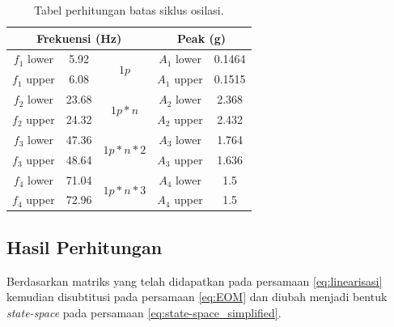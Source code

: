 \begin{table}[]
	\caption{Tabel perhitungan batas siklus osilasi.}
	\label{tb:batas_siklus}
	\centering
	\begin{tabular}{|ccc|cc|}
		\hline
		\multicolumn{3}{|c|}{Frekuensi (Hz)}                                                       & \multicolumn{2}{c|}{Peak (g)}             \\ \hline
		\multicolumn{1}{|c|}{$f_1$ lower} & \multicolumn{1}{c|}{5.92}  & \multirow{2}{*}{$1p$}       & \multicolumn{1}{c|}{$A_1$ lower} & 0.1464 \\ \cline{1-2} \cline{4-5} 
		\multicolumn{1}{|c|}{$f_1$ upper} & \multicolumn{1}{c|}{6.08}  &                           & \multicolumn{1}{c|}{$A_1$ upper} & 0.1515 \\ \hline
		\multicolumn{1}{|c|}{$f_2$ lower} & \multicolumn{1}{c|}{23.68} & \multirow{2}{*}{$1p*n$}   & \multicolumn{1}{c|}{$A_2$ lower} & 2.368  \\ \cline{1-2} \cline{4-5} 
		\multicolumn{1}{|c|}{$f_2$ upper} & \multicolumn{1}{c|}{24.32} &                           & \multicolumn{1}{c|}{$A_2$ upper} & 2.432  \\ \hline
		\multicolumn{1}{|c|}{$f_3$ lower} & \multicolumn{1}{c|}{47.36} & \multirow{2}{*}{$1p*n*2$} & \multicolumn{1}{c|}{$A_3$ lower} & 1.764 \\ \cline{1-2} \cline{4-5} 
		\multicolumn{1}{|c|}{$f_3$ upper} & \multicolumn{1}{c|}{48.64} &                           & \multicolumn{1}{c|}{$A_3$ upper} & 1.636  \\ \hline
		\multicolumn{1}{|c|}{$f_4$ lower} & \multicolumn{1}{c|}{71.04} & \multirow{2}{*}{$1p*n*3$} & \multicolumn{1}{c|}{$A_4$ lower} & 1.5    \\ \cline{1-2} \cline{4-5} 
		\multicolumn{1}{|c|}{$f_4$ upper} & \multicolumn{1}{c|}{72.96} &                           & \multicolumn{1}{c|}{$A_4$ upper} & 1.5    \\ \hline
	\end{tabular}
\end{table}

\subsection{Hasil Perhitungan}

Berdasarkan matriks yang telah didapatkan pada persamaan \ref{eq:linearisasi} kemudian disubtitusi pada persamaan \ref{eq:EOM} dan diubah menjadi bentuk \textit{state-space} pada persamaan \ref{eq:state-space_simplified}.

